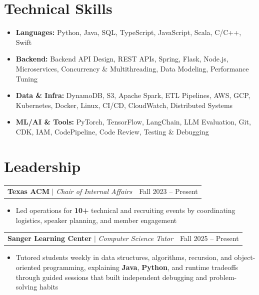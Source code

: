 \documentclass[letterpaper,10pt]{article}
\makeatletter
\newcommand{\resumeWorkHeading}[2]{%
  \vspace{1pt}\noindent
  \begin{tabular*}{\textwidth}{@{}l@{\extracolsep{\fill}}r@{}}
    #1 & #2 \\
  \end{tabular*}%
  \vspace{-4pt}
}
\newcommand{\resumeItemListStart}{\begin{itemize}}
\newcommand{\resumeItemListEnd}{\end{itemize}\vspace{0pt}}
\newcommand{\resumeItem}[1]{\item #1}
\makeatother
\begin{document}
\section{Technical Skills}
\begin{itemize}[leftmargin=0em,label={},itemsep=0pt,parsep=0pt,topsep=0pt]
\item \textbf{Languages:} Python, Java, SQL, TypeScript, JavaScript, Scala, C/C++, Swift
\item \textbf{Backend:} Backend API Design, REST APIs, Spring, Flask, Node.js, Microservices, Concurrency \& Multithreading, Data Modeling, Performance Tuning
\item \textbf{Data \& Infra:} DynamoDB, S3, Apache Spark, ETL Pipelines, AWS, GCP, Kubernetes, Docker, Linux, CI/CD, CloudWatch, Distributed Systems
\item \textbf{ML/AI \& Tools:} PyTorch, TensorFlow, LangChain, LLM Evaluation, Git, CDK, IAM, CodePipeline, Code Review, Testing \& Debugging
\end{itemize}

\section{Leadership}
\resumeWorkHeading
{\textbf{Texas ACM} $|$ \emph{Chair of Internal Affairs}}{Fall 2023 -- Present}
\resumeItemListStart
\resumeItem{Led operations for \textbf{10+} technical and recruiting events by coordinating logistics, speaker planning, and member engagement}
\resumeItemListEnd

\resumeWorkHeading
{\textbf{Sanger Learning Center} $|$ \emph{Computer Science Tutor}}{Fall 2025 -- Present}
\resumeItemListStart
\resumeItem{Tutored students weekly in data structures, algorithms, recursion, and object-oriented programming, explaining \textbf{Java}, \textbf{Python}, and runtime tradeoffs through guided sessions that built independent debugging and problem-solving habits}
\resumeItemListEnd
\end{document}

